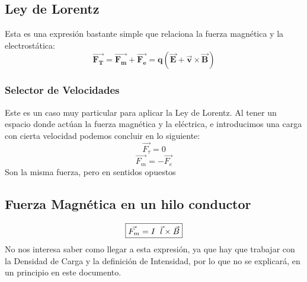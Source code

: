 \subsection{Ley de Lorentz}
 Esta es una expresión bastante simple que relaciona la fuerza magnética y la electrostática:
\[
        \boxed{\bm{\vec{F_T} =\vec{F_m} + \vec{F_e} =q(\vec{E} + \vec{v}\times\vec{B})}}
\]
\subsubsection{Selector de Velocidades}
\begin{wrapfigure}{r}{4cm}
\end{wrapfigure}
 Este es un caso muy particular para aplicar la Ley de Lorentz. Al tener un espacio donde actúan la fuerza magnética y la eléctrica, e introducimos una carga con cierta velocidad podemos concluir en lo siguiente:
\[
        \vec{F_{\tau}}=0
\]
\[
        \boxed{\vec{F_m} = -\vec{F_e}}
\]
Son la misma fuerza, pero en sentidos opuestos
\subsection{Fuerza Magnética en un hilo conductor}
\[
        \boxed{\vec{F_m} = I \hspace{2mm}\vec{l}\times\vec{B}}
\]
No nos interesa saber como llegar a esta expresión, ya que hay que trabajar con la Densidad de Carga y la definición de Intensidad, por lo que no se explicará, en un principio en este documento.
